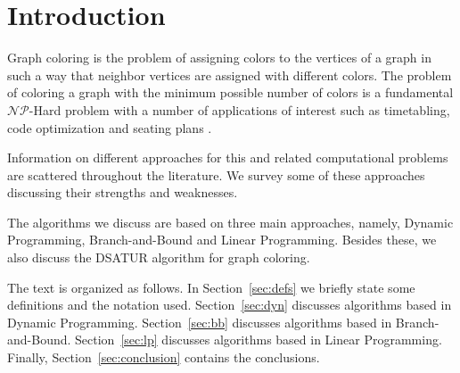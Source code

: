 \documentclass[fleqn,10pt]{SelfArx} %
\affiliation{\textsuperscript{1,2}\textit{Informatics, Federal University of Parana, Brazil}} %
\affiliation{*\textbf{Corresponding author}: amlima@inf.ufpr.br} %
\newcommand{\NP}{\ensuremath{\mathcal{N}\mathcal{P}}}
\begin{document}
	
	\setcounter{page}{57}
	
	\flushbottom %
	\maketitle %
	\thispagestyle{empty} %
	
	
	
	
	
	\section{Introduction} %
	
	Graph coloring is the problem of assigning colors to the vertices of a graph in
	such a way that neighbor vertices are assigned with different colors. The
	problem of coloring a graph with the minimum possible number of colors
	is a fundamental \NP-Hard problem with a number of applications of
	interest such as timetabling, code optimization and seating plans \cite{Lewis2015}.
	
	Information on different approaches for this and related computational
	problems are scattered throughout the literature. We survey some of
	these approaches discussing their strengths and weaknesses.
	
	The algorithms we discuss are based on three main approaches, namely,
	Dynamic Programming, Branch-and-Bound and Linear Programming. Besides
	these, we also discuss the \textsf{DSATUR} algorithm for graph
	coloring.
	
	The text is organized as follows. In Section~\ref{sec:defs} we briefly
	state some definitions and the notation used. Section~\ref{sec:dyn}
	discusses algorithms based in Dynamic
	Programming. Section~\ref{sec:bb} discusses algorithms based in
	Branch-and-Bound. Section~\ref{sec:lp} discusses algorithms based in
	Linear Programming. Finally, Section~\ref{sec:conclusion} contains the
	conclusions.
	
\end{document}
